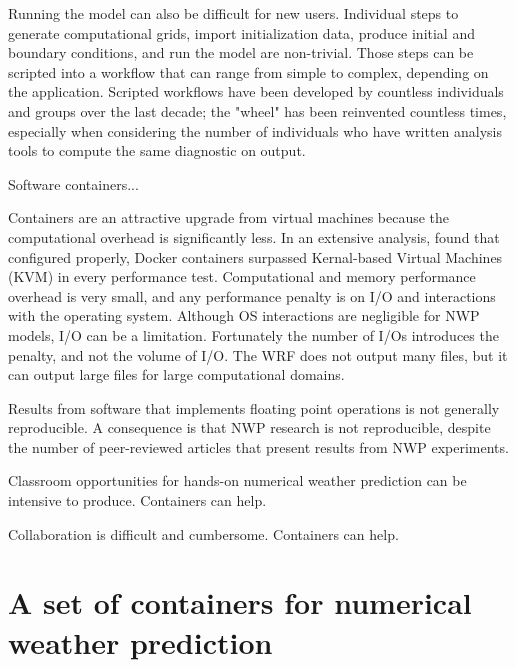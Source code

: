 \documentclass[draft]{ametsoc}
\begin{document}
Running the model can also be difficult for new users.  Individual steps to generate computational grids, import initialization data, produce initial and boundary conditions, and run the model are non-trivial.  Those steps can be scripted into a workflow that can range from simple to complex, depending on the application.  Scripted workflows have been developed by countless individuals and groups over the last decade; the "wheel" has been reinvented countless times, especially when considering the number of individuals who have written analysis tools to compute the same diagnostic on output.


Software containers...

Containers are an attractive upgrade from virtual machines because the computational overhead is significantly less. In an extensive analysis, \citet{Felter:2014} found that configured properly, Docker containers surpassed Kernal-based Virtual Machines (KVM) in every performance test. Computational and memory performance overhead is very small, and any performance penalty is on I/O and interactions with the operating system. Although OS interactions are negligible for NWP models, I/O can be a limitation. Fortunately the number of I/Os introduces the penalty, and not the volume of I/O.  The WRF does not output many files, but it can output large files for large computational domains.


Results from software that implements floating point operations is not generally reproducible. A consequence is that NWP research is not reproducible, despite the number of peer-reviewed articles that present results from NWP experiments.

Classroom opportunities for hands-on numerical weather prediction can be intensive to produce. Containers can help.

Collaboration is difficult and cumbersome. Containers can help.


\section{A set of containers for numerical weather prediction}
\end{document}

